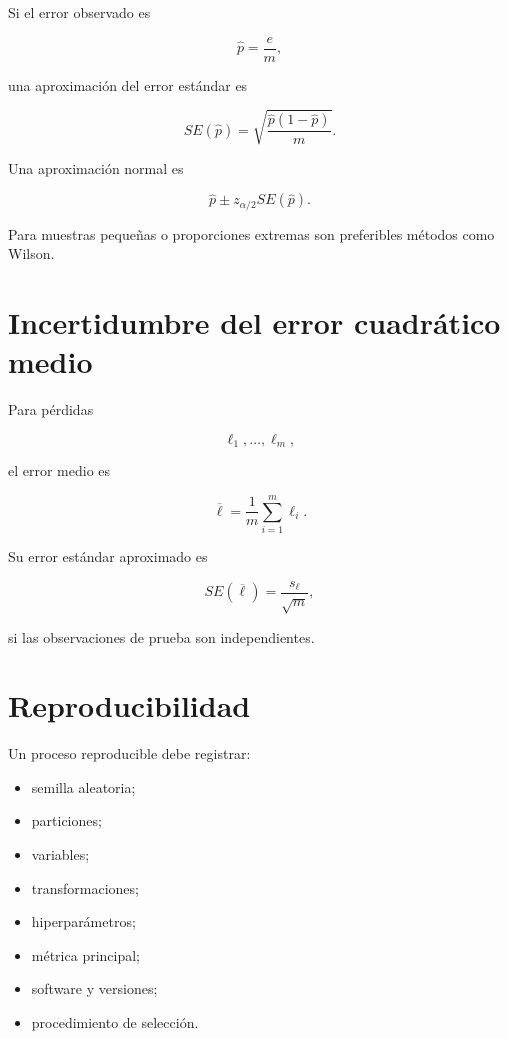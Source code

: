 \documentclass[
  spanish,
  10.5pt,
  letterpaper,
  DIV=11,
  numbers=noendperiod,
  oneside,
  open=any]{scrreprt}
\providecommand{\tightlist}{%
  \setlength{\itemsep}{0pt}\setlength{\parskip}{0pt}}
\theoremstyle{definition}
\theoremstyle{definition}
\theoremstyle{plain}
\theoremstyle{remark}
\begin{document}
Si el error observado es

\[
\widehat{p}
=
\frac{e}{m},
\]

una aproximación del error estándar es

\[
SE(\widehat{p})
=
\sqrt{
\frac{
\widehat{p}(1-\widehat{p})
}{
m
}
}.
\]

Una aproximación normal es

\[
\widehat{p}
\pm
z_{\alpha/2}
SE(\widehat{p}).
\]

Para muestras pequeñas o proporciones extremas son preferibles métodos
como Wilson.

\section*{Incertidumbre del error cuadrático
medio}\label{incertidumbre-del-error-cuadruxe1tico-medio}


Para pérdidas

\[
\ell_1,\ldots,\ell_m,
\]

el error medio es

\[
\overline{\ell}
=
\frac{1}{m}
\sum_{i=1}^{m}\ell_i.
\]

Su error estándar aproximado es

\[
SE(\overline{\ell})
=
\frac{s_\ell}{\sqrt{m}},
\]

si las observaciones de prueba son independientes.

\section*{Reproducibilidad}\label{reproducibilidad}


Un proceso reproducible debe registrar:

\begin{itemize}
\tightlist
\item
  semilla aleatoria;
\item
  particiones;
\item
  variables;
\item
  transformaciones;
\item
  hiperparámetros;
\item
  métrica principal;
\item
  software y versiones;
\item
  procedimiento de selección.
\end{itemize}
\end{document}
